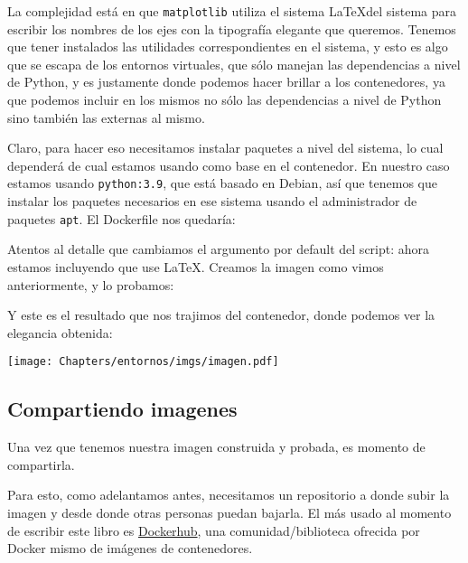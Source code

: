 La complejidad está en que \texttt{matplotlib} utiliza el sistema \LaTeX del sistema para escribir los nombres de los ejes con la tipografía elegante que queremos. Tenemos que tener instalados las utilidades correspondientes en el sistema, y esto es algo que se escapa de los entornos virtuales, que sólo manejan las dependencias a nivel de Python, y es justamente donde podemos hacer brillar a los contenedores, ya que podemos incluir en los mismos no sólo las dependencias a nivel de Python sino también las externas al mismo.

Claro, para hacer eso necesitamos instalar paquetes a nivel del sistema, lo cual dependerá de cual estamos usando como base en el contenedor. En nuestro caso estamos usando \texttt{python:3.9}, que está basado en Debian, así que tenemos que instalar los paquetes necesarios en ese sistema usando el administrador de paquetes \texttt{apt}. El Dockerfile nos quedaría:


Atentos al detalle que cambiamos el argumento por default del script: ahora estamos incluyendo que use \LaTeX. Creamos la imagen como vimos anteriormente, y lo probamos:


Y este es el resultado que nos trajimos del contenedor, donde podemos ver la elegancia obtenida:

\begin{center}
 \texttt{[image: Chapters/entornos/imgs/imagen.pdf]}
\end{center}


\subsection{Compartiendo imagenes}

Una vez que tenemos nuestra imagen construida y probada, es momento de compartirla.

Para esto, como adelantamos antes, necesitamos un repositorio a donde subir la imagen y desde donde otras personas puedan bajarla. El más usado al momento de escribir este libro es \href{https://hub.docker.com/search?q=&type=image}{Dockerhub}, una comunidad/biblioteca ofrecida por Docker mismo de imágenes de contenedores.

